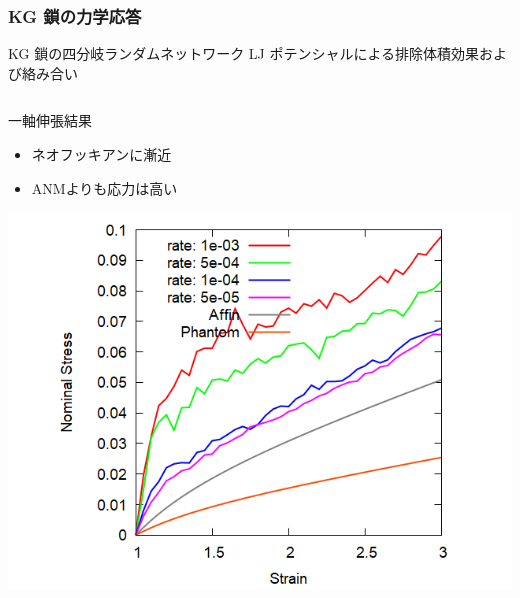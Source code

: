 \documentclass[12pt, dvipdfmx]{beamer}
\begin{document}
\begin{frame}
	\frametitle{KG 鎖の力学応答}
	\vspace{-3mm}
	\begin{alertblock}{KG 鎖の四分岐ランダムネットワーク}
		LJ ポテンシャルによる排除体積効果および絡み合い
	\end{alertblock}
	\vspace{-4mm}
	\begin{columns}[T, onlytextwidth]
			\begin{block}{一軸伸張結果}
				\begin{itemize}
					\item ネオフッキアンに漸近
					\item ANMよりも応力は高い
				\end{itemize}
				\includegraphics[width=\textwidth]{N48_C4_M3.png}
			\end{block}
			

\end{columns}
\end{frame}
\end{document}
